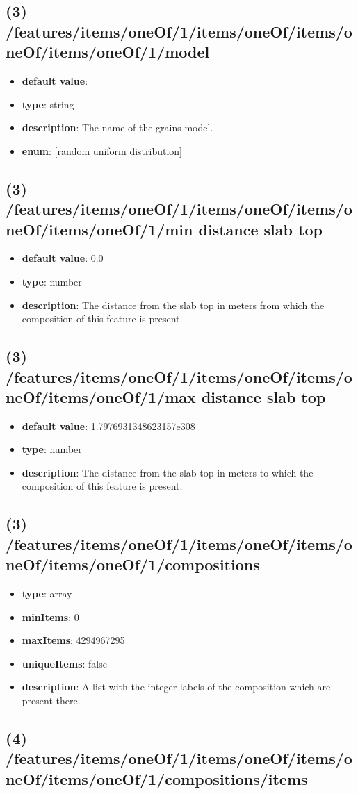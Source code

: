 \subsection{(3) /features/items/oneOf/1/items/oneOf/items/oneOf/items/oneOf/1/model}
\begin{itemize}[leftmargin=3em]\item {\bf default value}: 
\item {\bf type}: string
\item {\bf description}: The name of the grains model.
\item {\bf enum}: [random uniform distribution]\end{itemize}\subsection{(3) /features/items/oneOf/1/items/oneOf/items/oneOf/items/oneOf/1/min distance slab top}
\begin{itemize}[leftmargin=3em]\item {\bf default value}: 0.0
\item {\bf type}: number
\item {\bf description}: The distance from the slab top in meters from which the composition of this feature is present.
\end{itemize}\subsection{(3) /features/items/oneOf/1/items/oneOf/items/oneOf/items/oneOf/1/max distance slab top}
\begin{itemize}[leftmargin=3em]\item {\bf default value}: 1.7976931348623157e308
\item {\bf type}: number
\item {\bf description}: The distance from the slab top in meters to which the composition of this feature is present.
\end{itemize}\subsection{(3) /features/items/oneOf/1/items/oneOf/items/oneOf/items/oneOf/1/compositions}
\begin{itemize}[leftmargin=3em]\item {\bf type}: array
\item {\bf minItems}: 0
\item {\bf maxItems}: 4294967295
\item {\bf uniqueItems}: false
\item {\bf description}: A list with the integer labels of the composition which are present there.
\end{itemize}\subsection{(4) /features/items/oneOf/1/items/oneOf/items/oneOf/items/oneOf/1/compositions/items}
